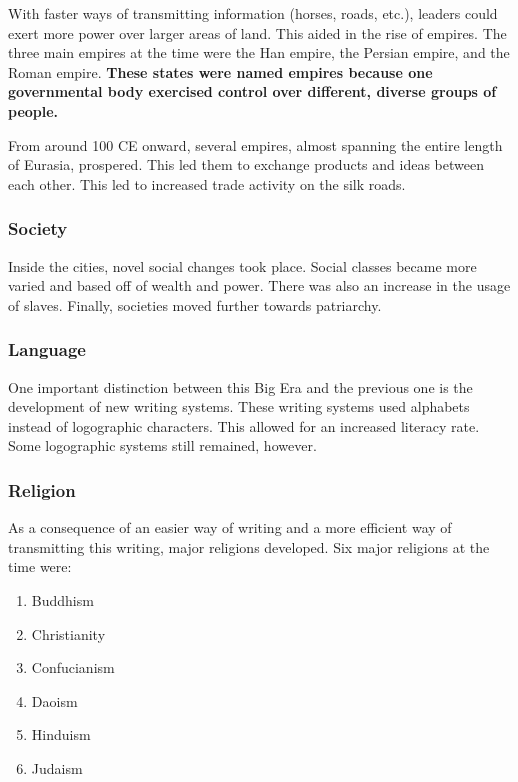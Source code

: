 \documentclass[11pt]{article}
\begin{document}
With faster ways of transmitting information (horses, roads, etc.), leaders could exert more power over larger areas of land. This aided in the rise of empires. The three main empires at the time were the Han empire, the Persian empire, and the Roman empire. \textbf{These states were named empires because one governmental body exercised control over different, diverse groups of people.}

From around 100 CE onward, several empires, almost spanning the entire length of Eurasia, prospered. This led them to exchange products and ideas between each other. This led to increased trade activity on the silk roads.

\subsubsection{Society}
\label{sec:orgc18ce7c}

Inside the cities, novel social changes took place. Social classes became more varied and based off of wealth and power. There was also an increase in the usage of slaves. Finally, societies moved further towards patriarchy.

\subsubsection{Language}
\label{sec:orgabf8d7d}

One important distinction between this Big Era and the previous one is the development of new writing systems. These writing systems used alphabets instead of logographic characters. This allowed for an increased literacy rate. Some logographic systems still remained, however.

\subsubsection{Religion}
\label{sec:org28fe336}

As a consequence of an easier way of writing and a more efficient way of transmitting this writing, major religions developed. Six major religions at the time were:

\begin{enumerate}
\item Buddhism
\item Christianity
\item Confucianism
\item Daoism
\item Hinduism
\item Judaism
\end{enumerate}
\end{document}

